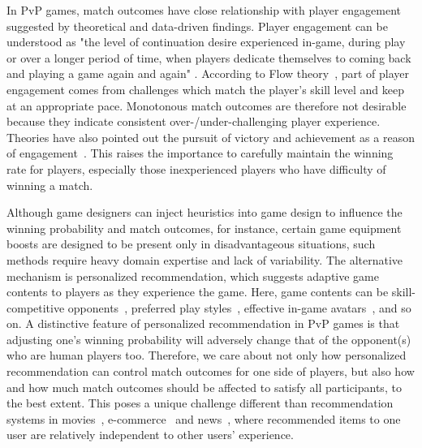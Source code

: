 In PvP games, match outcomes have close relationship with player engagement suggested by theoretical and data-driven findings. Player engagement can be understood as "the level of continuation desire experienced in-game, during play or over a longer period of time, when players dedicate themselves to coming back and playing a game again and again" \cite{schoenau2011player}. According to Flow theory~\cite{sweetser2005gameflow,flow1990psychology,chen2007flow}, part of player engagement comes from challenges which match the player's skill level and keep at an appropriate pace. Monotonous match outcomes are therefore not desirable because they indicate consistent over-/under-challenging player experience. Theories have also pointed out the pursuit of victory and achievement as a reason of engagement~\cite{schoenau2011player,yee2006motivations,sherry2006video,wu2010falling}. This raises the importance to carefully maintain the winning rate for players, especially those inexperienced players who have difficulty of winning a match. 

Although game designers can inject heuristics into game design to influence the winning probability and match outcomes, for instance, certain game equipment boosts are designed to be present only in disadvantageous situations, such methods require heavy domain expertise and lack of variability. The alternative mechanism is personalized recommendation, which suggests adaptive game contents to players as they experience the game. Here, game contents can be skill-competitive opponents~\cite{Delalleau2012,herbrich:trueskill}, preferred play styles~\cite{thue2007interactive,magerko2008intelligent}, effective in-game avatars~\cite{conley2013does}, and so on. A distinctive feature of  personalized recommendation in PvP games is that adjusting one's winning probability will adversely change that of the opponent(s) who are human players too. Therefore, we care about not only how personalized recommendation can control match outcomes for one side of players, but also how and how much match outcomes should be affected to satisfy all participants, to the best extent. This poses a unique challenge different than recommendation systems in movies~\cite{amatriain2012netflix}, e-commerce~\cite{linden2003amazon} and news~\cite{das2007google}, where recommended items to one user are relatively independent to other users' experience.




